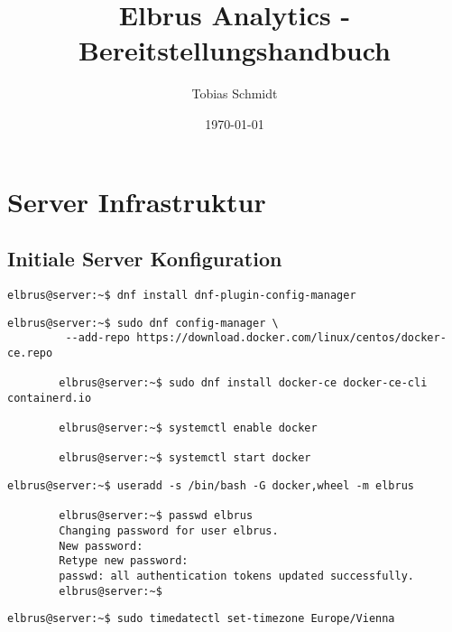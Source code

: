 \documentclass{article}
\begin{document}
	\title{Elbrus Analytics - Bereitstellungshandbuch}
	\author{Tobias Schmidt}
	\date{\today}
	\maketitle
	\newpage
	
	\section[Server Infrastruktur]{Server Infrastruktur}
	\subsection{Initiale Server Konfiguration}
	
	\begin{lstlisting}[caption={Installieren des DNF Konfigurations Managers, um in Folge das Remote Docker Repository hinzuzufügen.}]
		elbrus@server:~$ dnf install dnf-plugin-config-manager
	\end{lstlisting}

	\begin{lstlisting}[caption={Installieren und aktivieren von Docker.}]
		elbrus@server:~$ sudo dnf config-manager \
		 --add-repo https://download.docker.com/linux/centos/docker-ce.repo
		
		elbrus@server:~$ sudo dnf install docker-ce docker-ce-cli containerd.io
		
		elbrus@server:~$ systemctl enable docker
		
		elbrus@server:~$ systemctl start docker
	\end{lstlisting}

	\begin{lstlisting}[caption={Berechtigt den User Elbrus 'sudo' zu verwenden. Berechtigt den User Elbrus darüber hinaus Docker ohne 'sudo' aufzurufen. Zudem wird dem User ein Heimverzeichnis angelegt, sowie die 'Bash' als standard Konsole gesetzt.}]
		elbrus@server:~$ useradd -s /bin/bash -G docker,wheel -m elbrus
		
		elbrus@server:~$ passwd elbrus
		Changing password for user elbrus.
		New password:
		Retype new password:
		passwd: all authentication tokens updated successfully.
		elbrus@server:~$
	\end{lstlisting}

	\begin{lstlisting}[caption={Setzen der Zeitzone auf 'Europa/Wien'.}]
		elbrus@server:~$ sudo timedatectl set-timezone Europe/Vienna
	\end{lstlisting}
\end{document}
